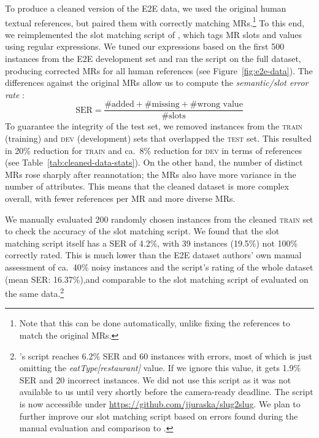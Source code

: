 \documentclass[11pt,a4paper]{article}
\begin{document}
To produce a cleaned version of the E2E data, we used the original human textual references, but paired them with correctly matching MRs.\footnote{Note that this can be done automatically, unlike fixing the references to match the original MRs.} 
To this end, we reimplemented the slot matching script of \citet{reed_can_2018}, which tags MR slots and values using regular expressions.
We tuned our expressions based on the first 500 instances from the E2E development set and ran the script on the full dataset, producing corrected MRs for all human references (see Figure~\ref{fig:e2e-data}).
The differences against the original MRs allow us to compute the \emph{semantic/slot error rate} \cite[SER;][]{wen:emnlp2015,reed_can_2018,dusek_evaluating_2019}:
\vspace{-0.1cm}
\begin{equation*}\label{eq:ser}
\mbox{SER} = \frac{\#\mbox{added} + \#\mbox{missing} + \#\mbox{wrong value}}{\#\mbox{slots}}
\end{equation*}
To guarantee the integrity of the test set,
we removed instances from the \textsc{train} (training) and \textsc{dev} (development) sets that overlapped the \textsc{test} set. This resulted in 20\% reduction for \textsc{train} and ca.~8\% reduction for \textsc{dev} in terms of references (see Table~\ref{tab:cleaned-data-stats}).
On the other hand, the number of distinct MRs rose sharply after reannotation; the MRs also have more variance in the number of attributes. 
This means that the cleaned dataset is more complex overall, with fewer references per MR and more diverse MRs.

We manually evaluated 200 randomly chosen instances from the cleaned \textsc{train} set to check the accuracy of the slot matching script. 
We found that the slot matching script itself has a SER of 4.2\%, with 39 instances (19.5\%) not 100\% correctly rated. 
This is much lower than the E2E dataset authors' own manual assessment of ca.~40\% noisy instances \cite{dusek_evaluating_2019} and the script's rating of the whole dataset (mean SER: 16.37\%),and comparable to the slot matching script of \citet{juraska_slug2slug:_2018} evaluated on the same data.\footnote{\citet{juraska_slug2slug:_2018}'s script reaches 6.2\% SER and 60 instances with errors, most of which is just omitting the \emph{eatType[restaurant]} value. If we ignore this value, it gets 1.9\% SER and 20 incorrect instances. We did not use this script as it was not available to us until very shortly before the camera-ready deadline. The script is now accessible under \url{https://github.com/jjuraska/slug2slug}. We plan to further improve our slot matching script based on errors found during the manual evaluation and comparison to \citet{juraska_slug2slug:_2018}.}
\end{document}
